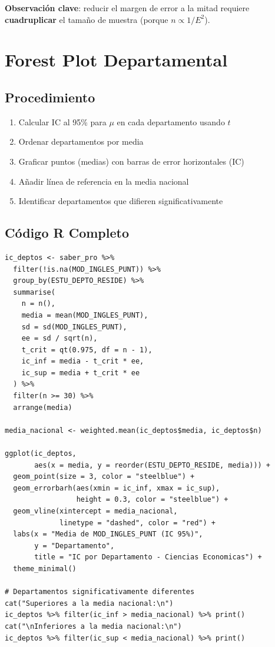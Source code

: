 \documentclass[11pt, a4paper]{article}
\begin{document}
\textbf{Observaci\'on clave}: reducir el margen de error a la mitad requiere \textbf{cuadruplicar} el tama\~no de muestra (porque $n \propto 1/E^2$).

\section{Forest Plot Departamental}

\subsection{Procedimiento}

\begin{enumerate}
  \item Calcular IC al 95\% para $\mu$ en cada departamento usando $t$
  \item Ordenar departamentos por media
  \item Graficar puntos (medias) con barras de error horizontales (IC)
  \item A\~nadir l\'inea de referencia en la media nacional
  \item Identificar departamentos que difieren significativamente
\end{enumerate}

\subsection{C\'odigo R Completo}

\begin{lstlisting}
ic_deptos <- saber_pro %>%
  filter(!is.na(MOD_INGLES_PUNT)) %>%
  group_by(ESTU_DEPTO_RESIDE) %>%
  summarise(
    n = n(),
    media = mean(MOD_INGLES_PUNT),
    sd = sd(MOD_INGLES_PUNT),
    ee = sd / sqrt(n),
    t_crit = qt(0.975, df = n - 1),
    ic_inf = media - t_crit * ee,
    ic_sup = media + t_crit * ee
  ) %>%
  filter(n >= 30) %>%
  arrange(media)

media_nacional <- weighted.mean(ic_deptos$media, ic_deptos$n)

ggplot(ic_deptos,
       aes(x = media, y = reorder(ESTU_DEPTO_RESIDE, media))) +
  geom_point(size = 3, color = "steelblue") +
  geom_errorbarh(aes(xmin = ic_inf, xmax = ic_sup),
                 height = 0.3, color = "steelblue") +
  geom_vline(xintercept = media_nacional,
             linetype = "dashed", color = "red") +
  labs(x = "Media de MOD_INGLES_PUNT (IC 95%)",
       y = "Departamento",
       title = "IC por Departamento - Ciencias Economicas") +
  theme_minimal()

# Departamentos significativamente diferentes
cat("Superiores a la media nacional:\n")
ic_deptos %>% filter(ic_inf > media_nacional) %>% print()
cat("\nInferiores a la media nacional:\n")
ic_deptos %>% filter(ic_sup < media_nacional) %>% print()
\end{lstlisting}
\end{document}
